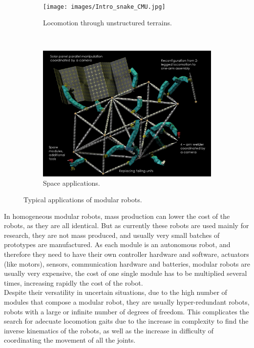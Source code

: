 \begin{figure}[h]
		\centering
        \begin{subfigure}[b]{0.45\textwidth}
                \centering
                \texttt{[image: images/Intro\_snake\_CMU.jpg]}
                \caption{Locomotion through unstructured terrains.}
                \label{fig:intro_snake_cmu}
        \end{subfigure}
        ~
        \begin{subfigure}[b]{0.45\textwidth}
                \centering
                \includegraphics[width=\textwidth]{images/Intro_molecubes.jpg}
                \caption{Space applications.}
                \label{fig:intro_space_applications}
        \end{subfigure}
        \caption{Typical applications of modular robots.}
        \label{fig:intro_applications}
\end{figure}

In homogeneous modular robots, mass production can lower the cost of the robots, as they are all identical. But as currently these robots are used mainly for research, they are not mass produced, and usually very small batches of prototypes are manufactured. As each module is an autonomous robot, and therefore they need to have their own controller hardware and software, actuators (like motors), sensors, communication hardware and batteries, modular robots are usually very expensive, the cost of one single module has to be multiplied several times, increasing rapidly the cost of the robot.\\

Despite their versatility in uncertain situations, due to the high number of modules that compose a modular robot, they are usually hyper-redundant robots, robots with a large or infinite number of degrees of freedom. This complicates the search for adecuate locomotion gaits due to the increase in complexity to find the inverse kinematics of the robots, as well as the increase in difficulty of coordinating the movement of all the joints. \\

